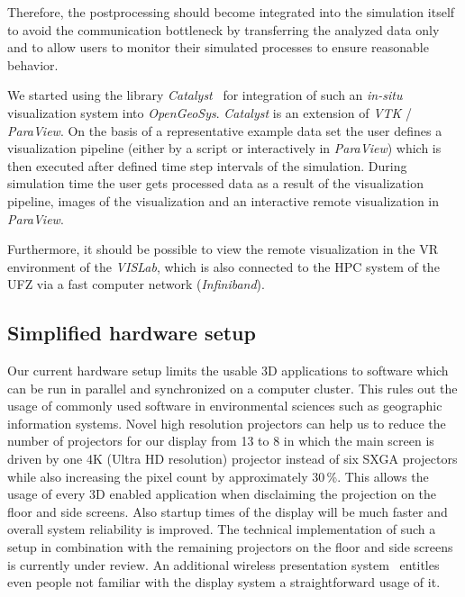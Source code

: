 \documentclass[twocolumn]{svjour3}          %
\begin{document}
Therefore, the postprocessing should become integrated into the simulation itself to avoid the communication bottleneck by transferring the analyzed data only and to allow users to monitor their simulated processes to ensure reasonable behavior.

We started using the library \emph{Catalyst}~\cite{web:catalyst} for integration of such an \emph{in-situ} visualization system into \emph{OpenGeoSys}. \emph{Catalyst} is an extension of \emph{VTK} / \emph{ParaView}. On the basis of a representative example data set the user defines a visualization pipeline (either by a script or interactively in \emph{Para\-View}) which is then executed after defined time step intervals of the simulation. During simulation time the user gets processed data as a result of the visualization pipeline, images of the visualization and an interactive remote visualization in \emph{ParaView}.

Furthermore, it should be possible to view the remote visualization in the VR environment of the \emph{VISLab}, which is also connected to the HPC system of the UFZ via a fast computer network (\emph{Infiniband}).

\subsection{Simplified hardware setup}
\label{simplified-hardware-setup}

Our current hardware setup limits the usable 3D applications to software which can be run in parallel and synchronized on a computer cluster. This rules out the usage of commonly used software in environmental sciences such as geographic information systems. Novel high resolution projectors can help us to reduce the number of projectors for our display from 13 to 8 in which the main screen is driven by one 4K (Ultra HD resolution) projector instead of six SXGA projectors while also increasing the pixel count by approximately 30\,\%. This allows the usage of every 3D enabled application when disclaiming the projection on the floor and side screens. Also startup times of the display will be much faster and overall system reliability is improved. The technical implementation of such a setup in combination with the remaining projectors on the floor and side screens is currently under review. An additional wireless presentation system~\cite{web:clickshare} entitles even people not familiar with the display system a straightforward usage of it.

\end{document}
